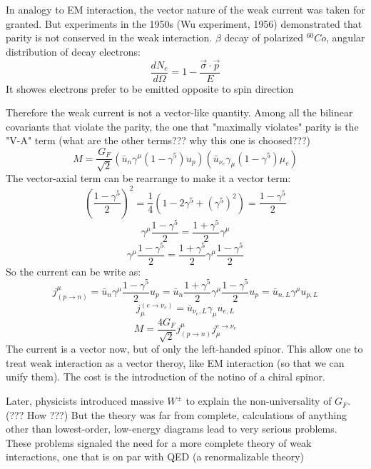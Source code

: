 In analogy to EM interaction, the vector nature of the weak current was taken
for granted. But experiments in the 1950s (Wu experiment, 1956) demonstrated 
that parity is not conserved in the weak interaction.
$\beta$ decay of polarized ${}^{60}Co$, angular distribution of decay electrons:
$$ \frac{dN_e}{d\Omega} = 1 - \frac{\vec{\sigma}\cdot\vec{p}}{E} $$
It showes electrons prefer to be emitted opposite to spin direction

Therefore the weak current is not a vector-like
quantity. Among all the bilinear covariants that violate the parity, the one
that "maximally violates" parity is the "V-A" term (what are the other terms???
why this one is choosed???)
$$ M = \frac{G_F}{\sqrt{2}}(\bar{u}_n \gamma^\mu(1-\gamma^5)u_p) (\bar{u}_{\nu_e}\gamma_\mu(1-\gamma^5)\mu_e)$$
The vector-axial term can be rearrange to make it a vector term:
$$ \left( \frac{1-\gamma^5}{2} \right)^2 = \frac{1}{4} (1 - 2\gamma^5 + (\gamma^5)^2) = \frac{1-\gamma^5}{2} $$
$$ \gamma^\mu \frac{1-\gamma^5}{2} = \frac{1+\gamma^5}{2}\gamma^\mu $$
$$ \gamma^\mu \frac{1-\gamma^5}{2} = \frac{1+\gamma^5}{2}\gamma^\mu \frac{1-\gamma^5}{2} $$
So the current can be write as:
$$ j^{\mu}_{(p \rightarrow n)} = \bar{u}_n \gamma^\mu \frac{1-\gamma^5}{2} u_p 
    = \bar{u}_n \frac{1+\gamma^5}{2}\gamma^\mu \frac{1-\gamma^5}{2} u_p 
    = \bar{u}_{n, L}\gamma^\mu u_{p, L}$$
$$ j_\mu^{(e \rightarrow \nu_e)} = \bar{u}_{\nu_e, L} \gamma_\mu u_{e, L} $$
$$ M = \frac{4G_F}{\sqrt{2}} j_{(p \rightarrow n)}^\mu j_\mu^{e \rightarrow \nu_e}$$
The current is a vector now, but of only the left-handed spinor. This allow one
to treat weak interaction as a vector theroy, like EM interaction (so that we
can unify them). The cost is the introduction of the notino of a chiral spinor.

Later, physicists introduced massive $W^{\pm}$ to explain the non-universality 
of $G_F$. (??? How ???) But the theory was far from complete, calculations of
anything other than lowest-order, low-energy diagrams lead to very serious
problems. These problems signaled the need for a more complete theory of weak
interactions, one that is on par with QED (a renormalizable theory)

